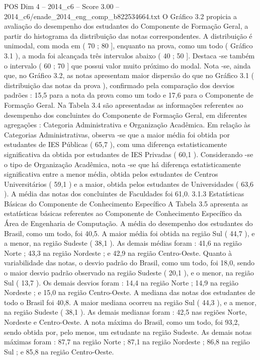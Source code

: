 \begin{textsample}{POS Dim 4 – 2014\_c6 – Score 3.00 – 2014\_c6/enade\_2014\_eng\_comp\_b822534664.txt}
O Gráfico 3.2 propicia a avaliação do desempenho dos estudantes do Componente de Formação Geral, a partir do histograma da distribuição das notas correspondentes.
A distribuição é unimodal, com moda em ( 70 ; 80 ], enquanto na prova, como um todo ( Gráfico 3.1 ), a moda foi alcançada três intervalos abaixo ( 40 ; 50 ].
Destaca -se também o intervalo ( 60 ; 70 ] que possui valor muito próximo do modal.
Nota -se, ainda que, no Gráfico 3.2, as notas apresentam maior dispersão do que no Gráfico 3.1 ( distribuição das notas da prova ), confirmado pela comparação dos desvios padrões : 15,5 para a nota da prova como um todo e 17,6 para o Componente de Formação Geral.
Na Tabela 3.4 são apresentadas as informações referentes ao desempenho dos concluintes do Componente de Formação Geral, em diferentes agregações : Categoria Administrativa e Organização Acadêmica.
Em relação às Categorias Administrativas, observa -se que a maior média foi obtida por estudantes de IES Públicas ( 65,7 ), com uma diferença estatisticamente significativa da obtida por estudantes de IES Privadas ( 60,1 ).
Considerando -se o tipo de Organização Acadêmica, nota -se que há diferença estatisticamente significativa entre a menor média, obtida pelos estudantes de Centros Universitários ( 59,1 ) e a maior, obtida pelos estudantes de Universidades ( 63,6 ).
A média das notas dos concluintes de Faculdades foi 61,0. 3.1.3 Estatísticas Básicas do Componente de Conhecimento Específico A Tabela 3.5 apresenta as estatísticas básicas referentes ao Componente de Conhecimento Específico da Área de Engenharia de Computação.
A média do desempenho dos estudantes do Brasil, como um todo, foi 40,5.
A maior média foi obtida na região Sul ( 44,7 ), e a menor, na região Sudeste ( 38,1 ).
As demais médias foram : 41,6 na região Norte ; 43,3 na região Nordeste ; e 42,9 na região Centro-Oeste.
Quanto à variabilidade das notas, o desvio padrão do Brasil, como um todo, foi 18,0, sendo o maior desvio padrão observado na região Sudeste ( 20,1 ), e o menor, na região Sul ( 13,7 ).
Os demais desvios foram : 14,4 na região Norte ; 14,9 na região Nordeste ; e 15,0 na região Centro-Oeste.
A mediana das notas dos estudantes de todo o Brasil foi 40,8.
A maior mediana ocorreu na região Sul ( 44,3 ), e a menor, na região Sudeste ( 38,1 ).
As demais medianas foram : 42,5 nas regiões Norte, Nordeste e Centro-Oeste.
A nota máxima do Brasil, como um todo, foi 93,2, sendo obtida por, pelo menos, um estudante na região Sudeste.
As demais notas máximas foram : 87,7 na região Norte ; 87,1 na região Nordeste ; 86,8 na região Sul ; e 85,8 na região Centro-Oeste.

\end{textsample}
